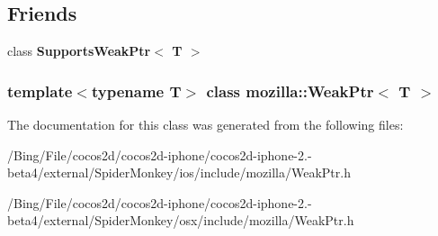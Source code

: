 \subsection*{Friends}
\begin{DoxyCompactItemize}
\item 
\hypertarget{classmozilla_1_1_weak_ptr_a00f0238e467d081ad1e365b25cb2d0f7}{class {\bfseries Supports\-Weak\-Ptr$<$ T $>$}}\label{classmozilla_1_1_weak_ptr_a00f0238e467d081ad1e365b25cb2d0f7}

\end{DoxyCompactItemize}
\subsubsection*{template$<$typename T$>$ class mozilla\-::\-Weak\-Ptr$<$ T $>$}



The documentation for this class was generated from the following files\-:\begin{DoxyCompactItemize}
\item 
/\-Bing/\-File/cocos2d/cocos2d-\/iphone/cocos2d-\/iphone-\/2.-\/beta4/external/\-Spider\-Monkey/ios/include/mozilla/Weak\-Ptr.\-h\item 
/\-Bing/\-File/cocos2d/cocos2d-\/iphone/cocos2d-\/iphone-\/2.-\/beta4/external/\-Spider\-Monkey/osx/include/mozilla/Weak\-Ptr.\-h\end{DoxyCompactItemize}
